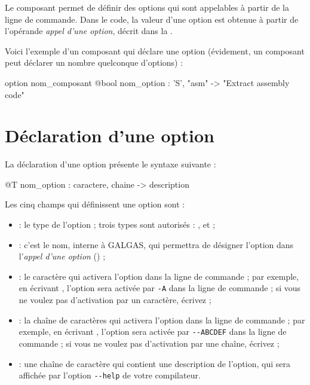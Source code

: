 


Le composant  permet de définir des options qui sont appelables à partir de la ligne de commande. Dans le code, la valeur d'une option est obtenue à partir de l'opérande \emph{appel d'une option}, décrit dans la .

Voici l'exemple d'un composant  qui déclare une option (évidement, un composant  peut déclarer un nombre quelconque d'options) :
\begin{galgascode}
option nom_composant {
  @bool nom_option : 'S', "asm" -> "Extract assembly code"
}
\end{galgascode}


\section{Déclaration d'une option}

La déclaration d'une option présente le syntaxe suivante :
\begin{galgascode}
  @T nom_option : caractere, chaine -> description
\end{galgascode}

Les cinq champs qui définissent une option sont :
\begin{itemize}
  \item {} : le type de l'option ; trois types sont autorisés : ,  et  ;
  \item {} : c'est le nom, interne à GALGAS, qui permettra de désigner l'option dans l'\emph{appel d'une option} () ; 
  \item {} : le caractère qui activera l'option dans la ligne de commande ; par exemple, en écrivant , l'option sera activée par \texttt{-A} dans la ligne de commande ; si vous ne voulez pas d'activation par un caractère, écrivez  ;
  \item {} : la chaîne de caractères qui activera l'option dans la ligne de commande ; par exemple, en écrivant , l'option sera activée par \texttt{-{}-ABCDEF} dans la ligne de commande ; si vous ne voulez pas d'activation par une chaîne, écrivez  ;
  \item {} : une chaîne de caractère qui contient une description de l'option, qui sera affichée par l'option \texttt{-{}-help} de votre compilateur.
\end{itemize}








